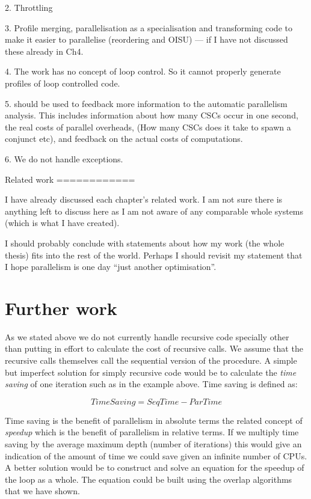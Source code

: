     2. Throttling 

    3. Profile merging, parallelisation as a specialisation and transforming
       code to make it easier to parallelise (reordering and OISU) ---
       if I have not discussed these already in Ch4.

    4. The \tscope work has no concept of loop control.  So it cannot
       properly generate profiles of loop controlled code.

    5. \tscope should be used to feedback more information to the automatic
       parallelism analysis.
       This includes information about how many CSCs occur in one second,
       the real costs of parallel overheads, (How many CSCs does it take to
       spawn a conjunct etc),
       and feedback on the actual costs of computations.

    6. We do not handle exceptions.

Related work
============

I have already discussed each chapter's related work.
I am not sure there is anything left to discuss here as I am not aware of any
comparable whole systems (which is what I have created).

I should probably conclude with statements about how my work (the whole
thesis) fits into the rest of the world.
Perhaps I should revisit my statement that I hope parallelism is one day
``just another optimisation''.


\section{Further work}
\label{sec:further_work}

As we stated above we do not currently handle recursive code specially other
than putting in effort to calculate the cost of recursive calls.
We assume that the recursive calls themselves call the sequential version of
the procedure.
A simple but imperfect solution for simply recursive code would be to
calculate the \emph{time saving} of one iteration such as in the example
above.
Time saving is defined as:

\begin{equation*}
TimeSaving = SeqTime - ParTime
\end{equation*}

\noindent
Time saving is the benefit of parallelism in absolute terms
the related concept of \emph{speedup} which is the benefit of parallelism in
relative terms.
If we multiply time saving by the average maximum depth (number of
iterations) this would give an indication of the amount of time we could
save given an infinite number of CPUs.
A better solution would be to construct and solve an equation for the
speedup of the loop as a whole.
The equation could be built using the overlap algorithms that we have shown.

